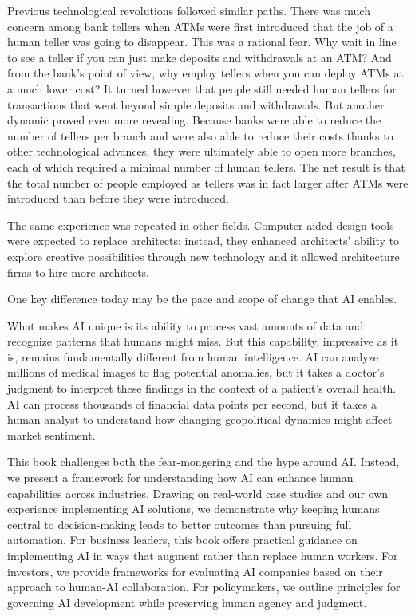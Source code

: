 \documentclass[
  Letterpaper,
]{scrbook}
\begin{document}
Previous technological revolutions followed similar paths. There was
much concern among bank tellers when ATMs were first introduced that the
job of a human teller was going to disappear. This was a rational fear.
Why wait in line to see a teller if you can just make deposits and
withdrawals at an ATM? And from the bank's point of view, why employ
tellers when you can deploy ATMs at a much lower cost? It turned however
that people still needed human tellers for transactions that went beyond
simple deposits and withdrawals. But another dynamic proved even more
revealing. Because banks were able to reduce the number of tellers per
branch and were also able to reduce their costs thanks to other
technological advances, they were ultimately able to open more branches,
each of which required a minimal number of human tellers. The net result
is that the total number of people employed as tellers was in fact
larger after ATMs were introduced than before they were introduced.

The same experience was repeated in other fields. Computer-aided design
tools were expected to replace architects; instead, they enhanced
architects' ability to explore creative possibilities through new
technology and it allowed architecture firms to hire more architects.

One key difference today may be the pace and scope of change that AI
enables.

What makes AI unique is its ability to process vast amounts of data and
recognize patterns that humans might miss. But this capability,
impressive as it is, remains fundamentally different from human
intelligence. AI can analyze millions of medical images to flag
potential anomalies, but it takes a doctor's judgment to interpret these
findings in the context of a patient's overall health. AI can process
thousands of financial data points per second, but it takes a human
analyst to understand how changing geopolitical dynamics might affect
market sentiment.

This book challenges both the fear-mongering and the hype around AI.
Instead, we present a framework for understanding how AI can enhance
human capabilities across industries. Drawing on real-world case studies
and our own experience implementing AI solutions, we demonstrate why
keeping humans central to decision-making leads to better outcomes than
pursuing full automation. For business leaders, this book offers
practical guidance on implementing AI in ways that augment rather than
replace human workers. For investors, we provide frameworks for
evaluating AI companies based on their approach to human-AI
collaboration. For policymakers, we outline principles for governing AI
development while preserving human agency and judgment.
\end{document}
